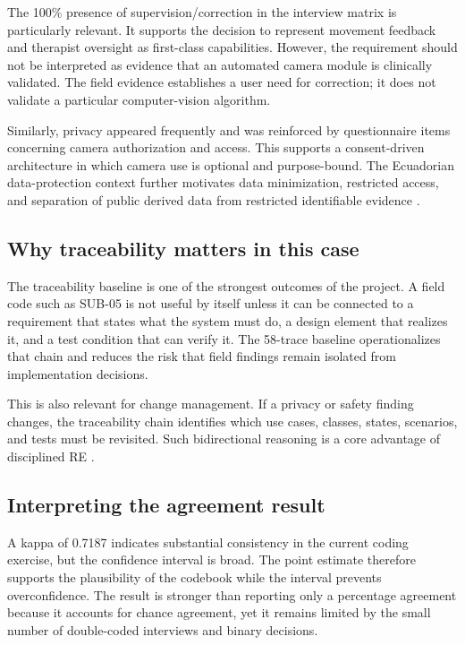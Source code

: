 \documentclass[pdflatex,sn-basic]{sn-jnl}
\begin{document}
The 100\% presence of supervision/correction in the interview matrix is particularly relevant. It supports the decision to represent movement feedback and therapist oversight as first-class capabilities. However, the requirement should not be interpreted as evidence that an automated camera module is clinically validated. The field evidence establishes a user need for correction; it does not validate a particular computer-vision algorithm.

Similarly, privacy appeared frequently and was reinforced by questionnaire items concerning camera authorization and access. This supports a consent-driven architecture in which camera use is optional and purpose-bound. The Ecuadorian data-protection context further motivates data minimization, restricted access, and separation of public derived data from restricted identifiable evidence \citep{ecuador2021lopdp}.

\subsection{Why traceability matters in this case}
The traceability baseline is one of the strongest outcomes of the project. A field code such as SUB-05 is not useful by itself unless it can be connected to a requirement that states what the system must do, a design element that realizes it, and a test condition that can verify it. The 58-trace baseline operationalizes that chain and reduces the risk that field findings remain isolated from implementation decisions.

This is also relevant for change management. If a privacy or safety finding changes, the traceability chain identifies which use cases, classes, states, scenarios, and tests must be revisited. Such bidirectional reasoning is a core advantage of disciplined RE \citep{pohl2010requirements,iso29148_2018}.

\subsection{Interpreting the agreement result}
A kappa of 0.7187 indicates substantial consistency in the current coding exercise, but the confidence interval is broad. The point estimate therefore supports the plausibility of the codebook while the interval prevents overconfidence. The result is stronger than reporting only a percentage agreement because it accounts for chance agreement, yet it remains limited by the small number of double-coded interviews and binary decisions.
\end{document}
